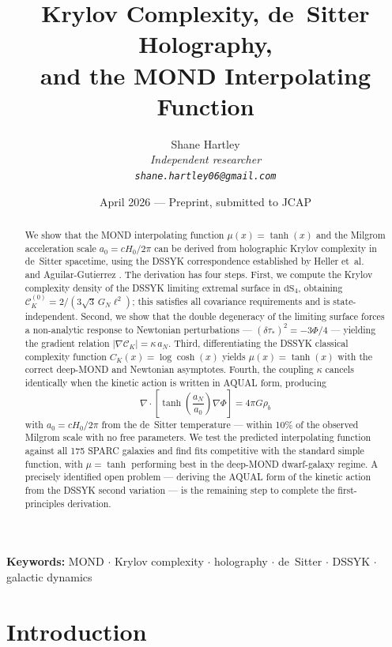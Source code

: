 \documentclass[a4paper,11pt]{article}
\title{\large\bfseries Krylov Complexity, de~Sitter Holography, \\[4pt]
       and the MOND Interpolating Function}
\author{Shane Hartley \\[4pt]
  \small\itshape Independent researcher \\
  \small \texttt{shane.hartley06@gmail.com}}
\date{April 2026 \quad --- \quad Preprint, submitted to JCAP}
\newcommand{\CK}{\mathcal{C}_K}                     %
\newcommand{\CKz}{\mathcal{C}_K^{(0)}}              %
\newcommand{\tausk}{\tau_*}                          %
\newcommand{\kap}{\kappa}                            %
\newcommand{\az}{a_0}                                %
\newcommand{\aN}{a_N}                                %
\newcommand{\GN}{G_N}                                %
\newcommand{\dS}[1]{\mathrm{dS}_{#1}}               %
\newcommand{\rhobar}{\rho_b}                         %
\begin{document}
\maketitle

\begin{abstract}
We show that the MOND interpolating function $\mu(x)=\tanh(x)$ and the
Milgrom acceleration scale $\az = cH_0/2\pi$ can be derived from
holographic Krylov complexity in de~Sitter spacetime, using the DSSYK
correspondence established by Heller et~al.\ \cite{Heller:2025} and
Aguilar-Gutierrez \cite{Aguilar:2024}.  The derivation has four steps.
First, we compute the Krylov complexity density of the DSSYK limiting
extremal surface in $\dS{4}$, obtaining
$\CKz = 2/(3\sqrt{3}\,\GN\ell^2)$; this satisfies all covariance
requirements and is state-independent.  Second, we show that the double
degeneracy of the limiting surface forces a non-analytic response to
Newtonian perturbations --- $(\delta\tausk)^2=-3\Phi/4$ --- yielding the
gradient relation $|\nabla\CK|=\kap\,\aN$.  Third, differentiating the
DSSYK classical complexity function $C_K(x)=\log\cosh(x)$ yields
$\mu(x)=\tanh(x)$ with the correct deep-MOND and Newtonian asymptotes.
Fourth, the coupling $\kap$ cancels identically when the kinetic action
is written in AQUAL form, producing
\begin{equation*}
  \nabla\cdot\!\left[\tanh\!\left(\frac{\aN}{\az}\right)\nabla\Phi\right]
  = 4\pi G\rhobar
\end{equation*}
with $\az = cH_0/2\pi$ from the de~Sitter temperature --- within 10\%
of the observed Milgrom scale with no free parameters.  We test the
predicted interpolating function against all 175 SPARC galaxies and find
fits competitive with the standard simple function, with $\mu=\tanh$
performing best in the deep-MOND dwarf-galaxy regime.  A precisely
identified open problem --- deriving the AQUAL form of the kinetic action
from the DSSYK second variation --- is the remaining step to complete the
first-principles derivation.
\end{abstract}

\noindent\textbf{Keywords:} MOND $\cdot$ Krylov complexity $\cdot$
holography $\cdot$ de~Sitter $\cdot$ DSSYK $\cdot$ galactic dynamics

\section{Introduction}
\label{sec:intro}
\end{document}
